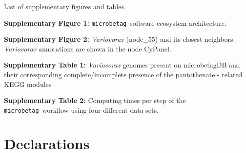 \documentclass[sn-mathphys,Numbered]{sn-jnl}  %
\theoremstyle{thmstyleone}%
\theoremstyle{thmstyletwo}%
\theoremstyle{thmstylethree}%
\newcommand{\microbetag}{\texttt{microbetag}}
\begin{document}
\backmatter



\label{supplementary-files}
    
    List of supplementary figures and tables.

    \textbf{Supplementary Figure 1:} \microbetag~software ecosystem architecture.

    \textbf{Supplementary Figure 2:} \textit{Variovorax} (node\_55) and its closest neighbors. \textit{Variovorax} annotations are shown in the node CyPanel.

    \textbf{Supplementary Table 1:} \textit{Variovorax} genomes present on microbetagDB and their corresponding complete/incomplete presence of the pantothenate - 
    related KEGG modules

    \textbf{Supplementary Table 2:} Computing times per step of the \microbetag~workflow using four different data sets. 



\section*{Declarations}
\end{document}
